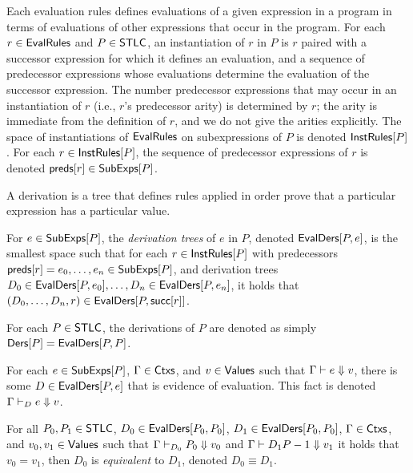 Each evaluation rules defines evaluations of a given expression in a
program in terms of evaluations of other expressions that occur in the
program.
%
For each $r \in \mathsf{EvalRules}$ and $P \in \mathsf{STLC}$, an instantiation of $r$
in $P$ is $r$ paired with a successor expression for which it defines
an evaluation, and a sequence of predecessor expressions whose
evaluations determine the evaluation of the successor expression.
%
The number predecessor expressions that may occur in an instantiation
of $r$ (i.e., $r$'s predecessor arity) is determined by $r$;
%
the arity is immediate from the definition of $r$, and we do not give
the arities explicitly.
%
The space of instantiations of $\mathsf{EvalRules}$ on subexpressions of $P$
is denoted $\mathsf{InstRules}[ P ]$.
%
For each $r \in \mathsf{InstRules}[ P ]$, the sequence of predecessor
expressions of $r$ is denoted $\mathsf{preds}[ r ] \in \mathsf{SubExps}[ P ]$.

A derivation is a tree that defines rules applied in order prove that
a particular expression has a particular value.
%
\begin{defn}
  For $e \in \mathsf{SubExps}[ P ]$, the \emph{derivation trees} of $e$ in $P$,
  denoted $\mathsf{EvalDers}[ P, e ]$, is the smallest space such that for each
  $r \in \mathsf{InstRules}[ P ]$ with predecessors $\mathsf{preds}[ r ] = e_0,
  \ldots, e_n \in \mathsf{SubExps}[ P ]$, and derivation trees $D_0 \in
  \mathsf{EvalDers}[ P, e_0 ], \ldots, D_n \in \mathsf{EvalDers}[ P, e_n ]$, it holds that
  $(D_0, \ldots, D_n, r) \in \mathsf{EvalDers}[ P, \mathsf{succ}[ r ] ]$.
\end{defn}
%
For each $P \in \mathsf{STLC}$, the derivations of $P$ are denoted as simply
$\mathsf{Ders}[ P ] = \mathsf{EvalDers}[ P, P ]$.

For each $e \in \mathsf{SubExps}[ P ]$, $\Gamma \in \mathsf{Ctxs}$, and $v \in \mathsf{Values}$
such that $\Gamma \vdash e \Downarrow v$, there is some $D \in
\mathsf{EvalDers}[ P, e ]$ that is evidence of evaluation.
%
This fact is denoted $\Gamma \vdash_D e \Downarrow v$.

For all $P_0, P_1 \in \mathsf{STLC}$, $D_0 \in \mathsf{EvalDers}[ P_0, P_0 ]$, $D_1 \in
\mathsf{EvalDers}[ P_0, P_0 ]$, $\Gamma \in \mathsf{Ctxs}$, and $v_0, v_1 \in \mathsf{Values}$
such that $\Gamma \vdash_{D_0} P_0 \Downarrow v_0$ and $\Gamma
\vdash{D_1} P-1 \Downarrow v_1$ it holds that $v_0 = v_1$, then $D_0$
is \emph{equivalent} to $D_1$, denoted $D_0 \equiv D_1$.

